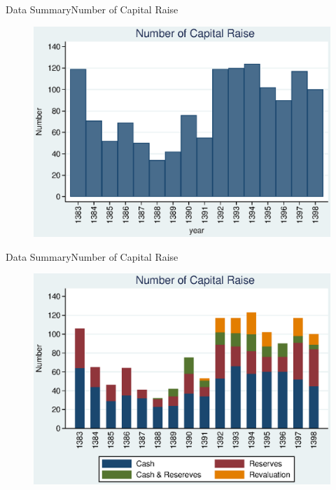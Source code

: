 \documentclass{beamer}
\begin{document}
\begin{frame}{Data Summary}{Number of Capital Raise}
\begin{figure}
\centering
\includegraphics[width=0.7\linewidth]{Number.eps}
\label{fig:number}
\end{figure}
\end{frame}

\begin{frame}{Data Summary}{Number of Capital Raise}
\begin{figure}
\centering
\includegraphics[width=0.7\linewidth]{Number2.eps}
\label{fig:number2}
\end{figure}

\end{frame}

\end{document}
